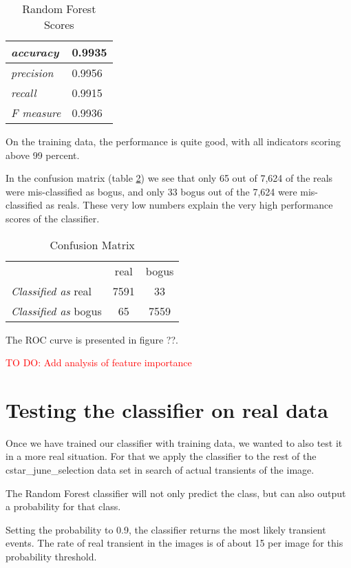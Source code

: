 \begin{table}
\centering
\begin{tabular}{| >{\itshape}l | l |}
  \hline
  accuracy & 0.9935 \\ \hline
  precision & 0.9956 \\ \hline
  recall & 0.9915 \\ \hline
  F measure & 0.9936 \\ \hline
\end{tabular}
\caption{Random Forest Scores}
\label{mlscores}
\end{table}

On the training data, the performance is quite good, with all indicators scoring above 99 percent.

In the confusion matrix (table \ref{mlconfusionmatrix}) we see that only 65 out of 7,624 of the reals were mis-classified as bogus, and only 33 bogus out of the 7,624 were mis-classified as reals. These very low numbers explain the very high performance scores of the classifier.

\begin{table}
\centering
\begin{tabular}{ l|c|c| }
\multicolumn{1}{r}{}
 &  \multicolumn{1}{c}{real}
 & \multicolumn{1}{c}{bogus} \\
\cline{2-3}
{\it Classified as} real & 7591 & 33 \\
\cline{2-3}
{\it Classified as} bogus & 65 & 7559 \\
\cline{2-3}
\end{tabular}
\caption{Confusion Matrix}
\label{mlconfusionmatrix}
\end{table}

The ROC curve is presented in figure ??.

\textcolor{red}{TO DO: Add analysis of feature importance}

\section{Testing the classifier on real data}

Once we have trained our classifier with training data, we wanted to also test it in a more real situation. For that we apply the classifier to the rest of the cstar\_june\_selection data set in search of actual transients of the image.

The Random Forest classifier will not only predict the class, but can also output a probability for that class.

Setting the probability to 0.9, the classifier returns the most likely transient events. The rate of real transient in the images is of about 15 per image for this probability threshold.


